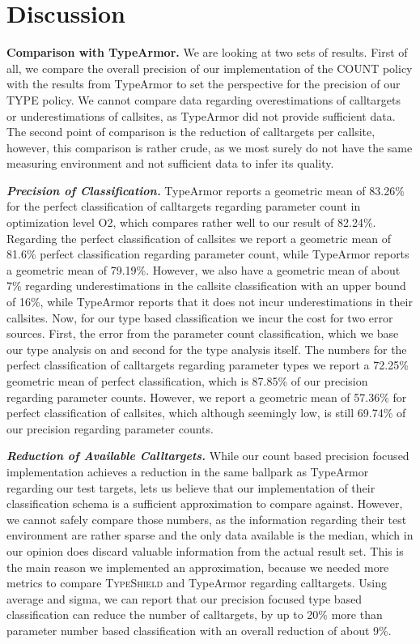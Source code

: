 \section{Discussion}
\label{chapter:Discussion}

\textbf{Comparison with TypeArmor.}
\label{section:comptype}
We are looking at two sets of results. First of all, we compare the overall precision of our implementation
of the COUNT policy with the results from TypeArmor to set the perspective for the precision of our TYPE 
policy. We cannot compare data regarding overestimations of calltargets or underestimations of callsites, 
as TypeArmor did not provide sufficient data. The second point of comparison is the reduction of calltargets
per callsite, however, this comparison is rather crude, as we most surely do not have the same measuring
environment and not sufficient data to infer its quality.

\textbf{\textit{Precision of Classification.}}
TypeArmor reports a geometric mean of 83.26\% for the perfect classification of calltargets regarding 
parameter count in optimization level O2, which compares rather well to our result of 82.24\%. Regarding
the perfect classification of callsites we report a geometric mean of 81.6\% perfect classification 
regarding parameter count, while TypeArmor reports a geometric mean of 79.19\%. However, we also have
a geometric mean of about 7\% regarding underestimations in the callsite classification with an upper
bound of 16\%, while TypeArmor reports that it does not incur underestimations in their callsites.
Now, for our type based classification we incur the cost for two error sources. First, the error from
the parameter count classification, which we base our type analysis on and second for the type analysis
itself. The numbers for the perfect classification of calltargets regarding parameter types we report a
72.25\% geometric mean of perfect classification, which is 87.85\% of our precision regarding parameter
counts. However, we report a geometric mean of 57.36\%
for perfect classification of callsites, which although seemingly low, is still 69.74\% of our precision
regarding parameter counts.

\textbf{\textit{Reduction of Available Calltargets.}}
While our count based precision focused implementation achieves a reduction in the same ballpark as
TypeArmor regarding our test targets, lets us believe that our implementation of their classification
schema is a sufficient approximation to compare against. However, we cannot safely compare those numbers,
as the information regarding their test environment are rather sparse and the only data available is the
median, which in our opinion does discard valuable information from the actual result set. This is the
main reason we implemented an approximation, because we needed more metrics to compare \textsc{TypeShield}
and TypeArmor regarding calltargets. Using average and sigma, we can report that our precision focused
type based classification can reduce the number of calltargets, by up to 20\% more than parameter number
based classification with an overall reduction of about 9\%.


